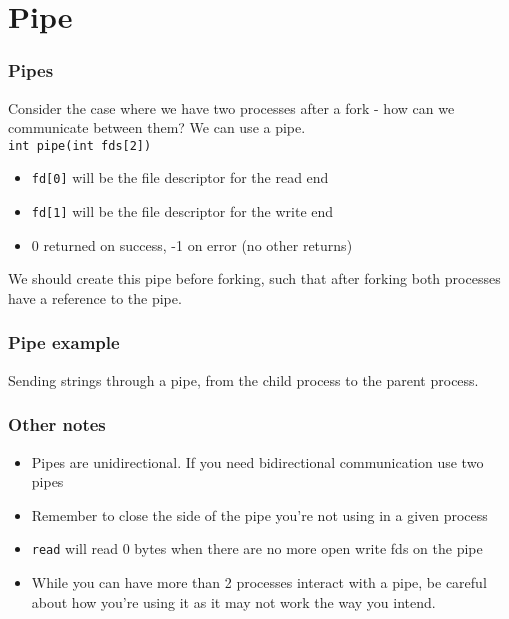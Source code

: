 \documentclass{beamer}
\begin{document}
\section{Pipe}
\begin{frame}
  \frametitle{Pipes}
  Consider the case where we have two processes after a fork - how can we communicate between them? We can use a pipe.\\
  \texttt{int pipe(int fds[2])}\\
  \begin{itemize}
    \item \texttt{fd[0]} will be the file descriptor for the read end
    \item \texttt{fd[1]} will be the file descriptor for the write end
    \item 0 returned on success, -1 on error (no other returns)
  \end{itemize}
  We should create this pipe before forking, such that after forking both processes have a reference to the pipe.
\end{frame}
\begin{frame}
  \frametitle{Pipe example}
  Sending strings through a pipe, from the child process to the parent process.
\end{frame}
\begin{frame}
  \frametitle{Other notes}
  \begin{itemize}
    \item Pipes are unidirectional. If you need bidirectional communication use two pipes
    \item Remember to close the side of the pipe you're not using in a given process
    \item \texttt{read} will read 0 bytes when there are no more open write fds on the pipe
    \item While you can have more than 2 processes interact with a pipe, be careful about how you're using it as it may not work the way you intend.
  \end{itemize}
\end{frame}
\end{document}
